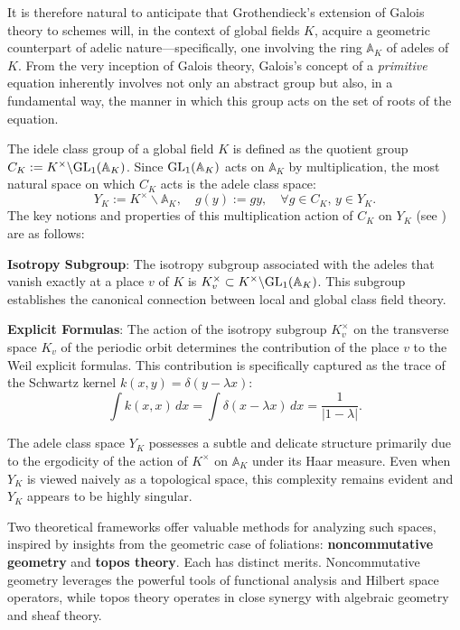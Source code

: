 \documentclass[letterpaper,11pt]{article}
\theoremstyle{plain}
\begin{document}
It is therefore natural to anticipate that Grothendieck's extension of Galois theory to schemes will, in the context of global fields $K$, acquire a geometric counterpart of  adelic nature—specifically, one involving the ring $\mathbb{A}_K$ of adeles of $K$. From the very inception of Galois theory, Galois's concept of a \emph{primitive} equation inherently involves not only an abstract group but also, in a fundamental way, the manner in which this group acts on the set of roots of the equation.\vspace{.02in}

The idele class group of a global field $K$ is defined as the quotient group $C_K := K^\times \backslash {\rm GL}_1(\mathbb{A}_K)$. Since ${\rm GL}_1(\mathbb{A}_K)$ acts on $\mathbb{A}_K$ by multiplication, the most natural space on which $C_K$ acts is the adele class space:  
\[
Y_K := K^\times \backslash \mathbb{A}_K, \quad g(y) := gy, \quad \forall g \in C_K, \, y \in Y_K.
\]  
The key notions and properties of this multiplication action of $C_K$ on $Y_K$ (see \cite{C}) are as follows:\vspace{.05in}  

\textbf{Isotropy Subgroup}: The isotropy subgroup associated with the adeles that vanish exactly at a place $ v $ of $ K $ is $ K_v^\times \subset K^\times \backslash {\rm GL}_1(\mathbb{A}_K) $. This subgroup establishes the canonical connection between local and global class field theory.  \vspace{.03in}

\textbf{Explicit Formulas}: The action of the isotropy subgroup $ K_v^\times $ on the transverse space $ K_v $ of the periodic orbit determines the contribution of the place $ v $ to the Weil explicit formulas. This contribution is specifically captured as the trace of the Schwartz kernel $ k(x, y) = \delta(y - \lambda x) $:
\[
\int k(x, x) \, dx = \int \delta(x - \lambda x) \, dx = \frac{1}{|1 - \lambda|}.
\]  

The adele class space $Y_K$ possesses a subtle and delicate structure primarily due to the ergodicity of the action of $K^\times$ on $ \mathbb{A}_K$ under its Haar measure. Even  when $Y_K$ is viewed naively as a topological space, this complexity remains evident and $Y_K$ appears to be highly singular.

Two theoretical frameworks offer valuable methods for analyzing  such spaces, inspired by insights from the geometric case of foliations: \textbf{noncommutative geometry} and \textbf{topos theory}. Each has distinct merits. Noncommutative geometry leverages the powerful tools of functional analysis and Hilbert space operators, while topos theory operates in close synergy with algebraic geometry and sheaf theory. \vspace{.03in} 
\end{document}
